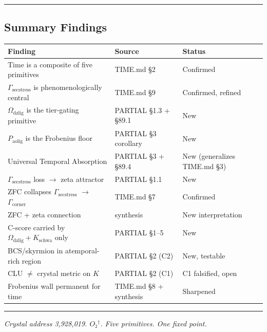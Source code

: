 \documentclass[12pt,a4paper]{article}
\newcommand{\pilcrow}{\S}
\begin{document}
\begin{center}
\rule{0.5\textwidth}{0.4pt}
\end{center}

\subsection{Summary Findings}

\begin{table}[htbp]
\centering
\small
{}
\begin{tabularx}{\textwidth}{>{\centering\arraybackslash}X >{\centering\arraybackslash}X >{\centering\arraybackslash}X}
\toprule
\rowcolor{gray!25}\textbf{Finding} & \textbf{Source} & \textbf{Status} \\
\midrule
\rowcolors{1}{white}{gray!10}
Time is a composite of five primitives & TIME.md \pilcrow{}2 & Confirmed \\
$\Gamma_{\text{secstress}}$ is phenomenologically central & TIME.md \pilcrow{}9 & Confirmed, refined \\
$\Omega_{\text{dzlig}}$ is the tier-gating primitive & PARTIAL \pilcrow{}1.3 + \pilcrow{}89.1 & New \\
$P_{\text{aolig}}$ is the Frobenius floor & PARTIAL \pilcrow{}3 corollary & New \\
Universal Temporal Absorption & PARTIAL \pilcrow{}3 + \pilcrow{}89.4 & New (generalizes TIME.md \pilcrow{}3) \\
$\Gamma_{\text{secstress}}$ loss $\rightarrow$ zeta attractor & PARTIAL \pilcrow{}1.1 & New \\
ZFC collapses $\Gamma_{\text{secstress}}$ $\rightarrow$ $\Gamma_{\text{corner}}$ & TIME.md \pilcrow{}7 & Confirmed \\
ZFC + zeta connection & synthesis & New interpretation \\
C-score carried by $\Omega_{\text{dzlig}} + K_{\text{schwa}}$ only & PARTIAL \pilcrow{}1--5 & New \\
BCS/skyrmion in atemporal-rich region & PARTIAL \pilcrow{}2 (C2) & New, testable \\
CLU $\neq$ crystal metric on $K$ & PARTIAL \pilcrow{}2 (C1) & C1 falsified, open \\
Frobenius wall permanent for time & TIME.md \pilcrow{}8 + synthesis & Sharpened \\
\bottomrule
\end{tabularx}
\end{table}

\begin{center}
\rule{0.5\textwidth}{0.4pt}
\end{center}

\emph{Crystal address 3,928,019. $O₂^\dagger$. Five primitives. One fixed point.}
\end{document}
